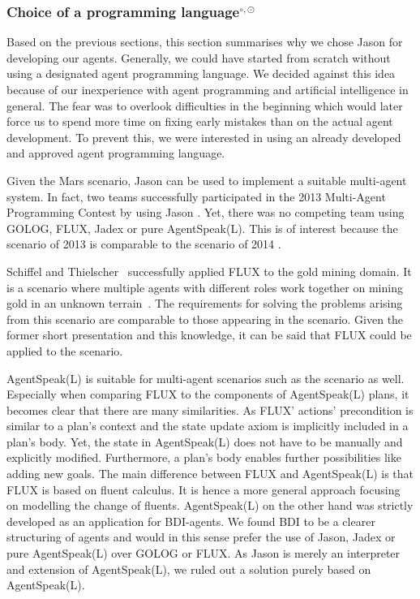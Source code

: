 \subsubsection[Choice of a programming language]{Choice of a programming language$^{\circ,\odot}$}\label{fun:apl_choice}
Based on the previous sections, this section summarises why we chose Jason for developing our agents.
Generally, we could have started from scratch without using a designated agent programming language.
We decided against this idea because of our inexperience with agent programming and artificial intelligence in general.
The fear was to overlook difficulties in the beginning which would later force us to spend more time on fixing early mistakes than on the actual agent development.
To prevent this, we were interested in using an already developed and approved agent programming language.

Given the Mars scenario, Jason can be used to implement a suitable multi-agent system.
In fact, two teams successfully participated in the 2013 Multi-Agent Programming Contest by using Jason \cite{ahlbrecht_multi_2013}. %
Yet, there was no competing team using GOLOG, FLUX, Jadex or pure AgentSpeak(L).
This is of interest because the scenario of 2013 is comparable to the scenario of 2014 \cite{ahlbrecht_mapc_2014}. %

Schiffel and Thielscher~\cite{schiffel_multi-agent_2007} successfully applied FLUX to the gold mining domain.
It is a scenario where multiple agents with different roles work together on mining gold in an unknown terrain~\cite{schiffel_multi-agent_2007}.
The requirements for solving the problems arising from this scenario are comparable to those appearing in the \mars scenario.
Given the former short presentation and this knowledge, it can be said that FLUX could be applied to the \mars scenario.

AgentSpeak(L) is suitable for multi-agent scenarios such as the \mars scenario as well.
Especially when comparing FLUX to the components of AgentSpeak(L) plans, it becomes clear that there are many similarities.
As FLUX' actions' precondition is similar to a plan's context and the state update axiom is implicitly included in a plan's body.
Yet, the state in AgentSpeak(L) does not have to be manually and explicitly modified.
Furthermore, a plan's body enables further possibilities like adding new goals.
The main difference between FLUX and AgentSpeak(L) is that FLUX is based on fluent calculus.
It is hence a more general approach focusing on modelling the change of fluents.
AgentSpeak(L) on the other hand was strictly developed as an application for BDI-agents.
We found BDI to be a clearer structuring of agents and would in this sense prefer the use of Jason, Jadex or pure AgentSpeak(L) over GOLOG or FLUX.
As Jason is merely an interpreter and extension of AgentSpeak(L), we ruled out a solution purely based on AgentSpeak(L).


